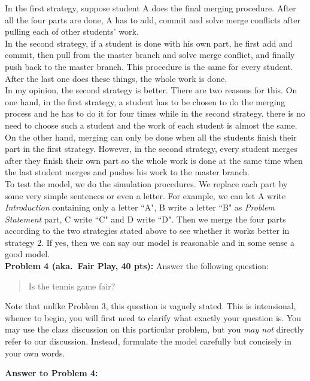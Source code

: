 \documentclass[12pt]{article}
\begin{document}
In the first strategy, suppose student A does the final merging procedure. After all the four parts are done, A has to add, commit and solve merge conflicts after pulling each of other students' work.\\

In the second strategy, if a student is done with his own part, he first add and commit, then pull from the master branch and solve merge conflict, and finally push back to the master branch. This procedure is the same for every student. After the last one does these things, the whole work is done.\\

In my opinion, the second strategy is better. There are two reasons for this. On one hand, in the first strategy, a student has to be chosen to do the merging process and he has to do it for four times while in the second strategy, there is no need to choose such a student and the work of each student is almost the same. On the other hand, merging can only be done when all the students finish their part in the first strategy. However, in the second strategy, every student merges after they finish their own part so the whole work is done at the same time when the last student merges and pushes his work to the master branch.\\

To test the model, we do the simulation procedures. We replace each part by some very simple sentences or even a letter. For example, we can let A write \emph{Introduction} containing only a letter ``A", B write a letter ``B" as \emph{Problem Statement} part, C write ``C" and D write ``D". Then we merge the four parts according to the two strategies stated above to see whether it works better in strategy 2. If yes, then we can say our model is reasonable and in some sense a good model.\\


\newpage
\vskip0.25in
\noindent\textbf{Problem 4 (aka.\ Fair Play, 40 pts):}
Answer the following question:
\begin{verse}
Is the tennis game fair?
\end{verse}
Note that unlike Problem 3, this question is vaguely stated.
This is intensional, whence to begin, you will first need to clarify
what exactly your question is.
You may use the class discussion on this particular 
problem, but you \emph{may not} directly refer to our 
discussion.  Instead, formulate the model carefully but concisely in 
your own words.   

\newpage
\noindent\textbf{Answer to Problem 4:}\\
\end{document}
